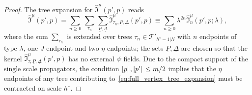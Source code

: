 \documentclass[a4paper, 11pt]{article}
\newcommand{\trees}{\mathcal{T}}							%
\theoremstyle{thm}
\begin{document}
\begin{proof}
The tree expansion for $\hat{\mathfrak{I}}^\mu(p', p)$ reads
\begin{equation}
\label{eq:full_vertex_tree_expansion}
\hat{\mathfrak{I}}^\mu(p', p) = \sum_{n \ge 0} \, \sum_{\tau_n} \, \sum_{\underline{P}, \underline{\Delta}} \hat{\mathfrak{I}}^\mu_{\tau_n, \underline{P}, \underline{\Delta}}(p', p) \equiv \sum_{n \ge 0} \lambda^{2n} \hat{\mathfrak{I}}^\mu_n(p', p; \lambda),
\end{equation}
where the sum $\sum_{\tau_n}$ is extended over trees $\tau_n \in \trees'_{h^\star-1|N}$ with $n$ endpoints of type $\lambda$, one $J$ endpoint and two $\eta$ endpoints; the sets $\underline{P}, \underline{\Delta}$ are chosen so that the kernel $\hat{\mathfrak{I}}^\mu_{\tau, \underline{P}, \underline{\Delta}}(p', p)$ has no external $\psi$ fields. Due to the compact support of the single scale propagators, the condition $\abs*{p}, \abs*{p'} \le m/2$ implies that the $\eta$ endpoints of any tree contributing to~\eqref{eq:full_vertex_tree_expansion} must be contracted on scale $h^\star$.


\end{proof}
\end{document}
